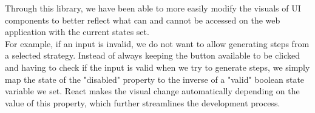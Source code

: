 Through this library, we have been able to more easily modify the visuals of UI components to better reflect what can and cannot be accessed on the web application with the current states set. 
\\ For example, if an input is invalid, we do not want to allow generating steps from a selected strategy. Instead of always keeping the button available to be clicked and having to check if the input is valid when we try to generate steps, we simply map the state of the "disabled" property to the inverse of a "valid" boolean state variable we set. React makes the visual change automatically depending on the value of this property, which further streamlines the development process.

